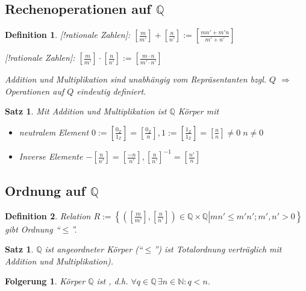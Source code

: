 \documentclass[ngerman,a4paper]{report}
\theoremstyle{break}
\newtheorem{satz}[theorem]{Satz}
\newtheorem*{definition}{Definition}
\newtheorem{conclusion}[theorem]{Folgerung}
\begin{document}
\subsection*{Rechenoperationen auf $\mathbb{Q}$}
\begin{definition}
	[!rationale Zahlen]: $\left[ \frac{m}{m'}\right] + \left[ \frac{n}{n'}\right] := \left[ \frac{mn' + m'n}{m'+n'}\right]$
	
	[!rationale Zahlen]: $\left[\frac{m}{m'}\right]\cdot\left[\frac{n}{n'}\right]:=\left[\frac{m\cdot n}{m'\cdot n'}\right]$
	
	Addition und Multiplikation sind unabhängig vom Repräsentanten bzgl. $Q$ $\Rightarrow$ Operationen auf $Q$ eindeutig definiert.
\end{definition}

\begin{satz}
	Mit Addition und Multiplikation ist $\mathbb{Q}$ Körper mit
	\begin{itemize}
	\item neutralem Element $0:=\left[\frac{0_\mathbb{Z}}{1_\mathbb{Z}}\right] = \left[\frac{0_\mathbb{Z}}{n}\right], 1 :=\left[\frac{1_\mathbb{Z}}{1_\mathbb{Z}}\right] = \left[ \frac{n}{n}\right] \neq 0\;n\neq 0$
	\item Inverse Elemente $-\left[\frac{n}{n'}\right] = \left[ \frac{-n}{n'}\right], \left[\frac{n}{n'}\right]^{-1} = \left[\frac{n'}{n}\right]$
	\end{itemize}
\end{satz}

\subsection*{Ordnung auf $\mathbb{Q}$}
\begin{definition}
	Relation $R:=\left\lbrace \left. \left( \left[\frac{m}{m'}\right],\left[\frac{n}{n'}\right]\right)\in\mathbb{Q}\times\mathbb{Q} \right| mn'\le m'n'; m',n'>0\right\rbrace$ gibt Ordnung "`$\le$"'.
\end{definition}

\begin{satz}
	$\mathbb{Q}$ ist angeordneter Körper ("`$\leq$"') ist Totalordnung verträglich mit Addition und Multiplikation).
\end{satz}
\begin{conclusion}
	Körper $\mathbb{Q}$ ist , d.h. $\forall q\in\mathbb{Q} \, \exists n\in\mathbb{N}: q < n$.
\end{conclusion}
\end{document}
